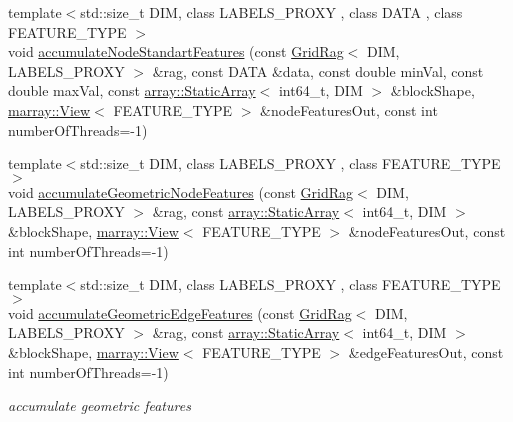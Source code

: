 \begin{DoxyCompactItemize}
\item 
{\footnotesize template$<$std\+::size\+\_\+t D\+I\+M, class L\+A\+B\+E\+L\+S\+\_\+\+P\+R\+O\+X\+Y , class D\+A\+T\+A , class F\+E\+A\+T\+U\+R\+E\+\_\+\+T\+Y\+P\+E $>$ }\\void \hyperlink{namespacenifty_1_1graph_ad7d29a3cfced104a7af73df235b91238}{accumulate\+Node\+Standart\+Features} (const \hyperlink{classnifty_1_1graph_1_1GridRag}{Grid\+Rag}$<$ D\+I\+M, L\+A\+B\+E\+L\+S\+\_\+\+P\+R\+O\+X\+Y $>$ \&rag, const D\+A\+T\+A \&data, const double min\+Val, const double max\+Val, const \hyperlink{namespacenifty_1_1array_a683f151f19c851754e0c6d55ed16a0c2}{array\+::\+Static\+Array}$<$ int64\+\_\+t, D\+I\+M $>$ \&block\+Shape, \hyperlink{classandres_1_1View}{marray\+::\+View}$<$ F\+E\+A\+T\+U\+R\+E\+\_\+\+T\+Y\+P\+E $>$ \&node\+Features\+Out, const int number\+Of\+Threads=-\/1)
\item 
{\footnotesize template$<$std\+::size\+\_\+t D\+I\+M, class L\+A\+B\+E\+L\+S\+\_\+\+P\+R\+O\+X\+Y , class F\+E\+A\+T\+U\+R\+E\+\_\+\+T\+Y\+P\+E $>$ }\\void \hyperlink{namespacenifty_1_1graph_a11bcf8795f57d9e5200fa52c1fb3a883}{accumulate\+Geometric\+Node\+Features} (const \hyperlink{classnifty_1_1graph_1_1GridRag}{Grid\+Rag}$<$ D\+I\+M, L\+A\+B\+E\+L\+S\+\_\+\+P\+R\+O\+X\+Y $>$ \&rag, const \hyperlink{namespacenifty_1_1array_a683f151f19c851754e0c6d55ed16a0c2}{array\+::\+Static\+Array}$<$ int64\+\_\+t, D\+I\+M $>$ \&block\+Shape, \hyperlink{classandres_1_1View}{marray\+::\+View}$<$ F\+E\+A\+T\+U\+R\+E\+\_\+\+T\+Y\+P\+E $>$ \&node\+Features\+Out, const int number\+Of\+Threads=-\/1)
\item 
{\footnotesize template$<$std\+::size\+\_\+t D\+I\+M, class L\+A\+B\+E\+L\+S\+\_\+\+P\+R\+O\+X\+Y , class F\+E\+A\+T\+U\+R\+E\+\_\+\+T\+Y\+P\+E $>$ }\\void \hyperlink{namespacenifty_1_1graph_a152a70f798b787b7fe72acfa1927e098}{accumulate\+Geometric\+Edge\+Features} (const \hyperlink{classnifty_1_1graph_1_1GridRag}{Grid\+Rag}$<$ D\+I\+M, L\+A\+B\+E\+L\+S\+\_\+\+P\+R\+O\+X\+Y $>$ \&rag, const \hyperlink{namespacenifty_1_1array_a683f151f19c851754e0c6d55ed16a0c2}{array\+::\+Static\+Array}$<$ int64\+\_\+t, D\+I\+M $>$ \&block\+Shape, \hyperlink{classandres_1_1View}{marray\+::\+View}$<$ F\+E\+A\+T\+U\+R\+E\+\_\+\+T\+Y\+P\+E $>$ \&edge\+Features\+Out, const int number\+Of\+Threads=-\/1)
\begin{DoxyCompactList}\small\item\em accumulate geometric features \end{DoxyCompactList}\item 

\end{DoxyCompactItemize}
